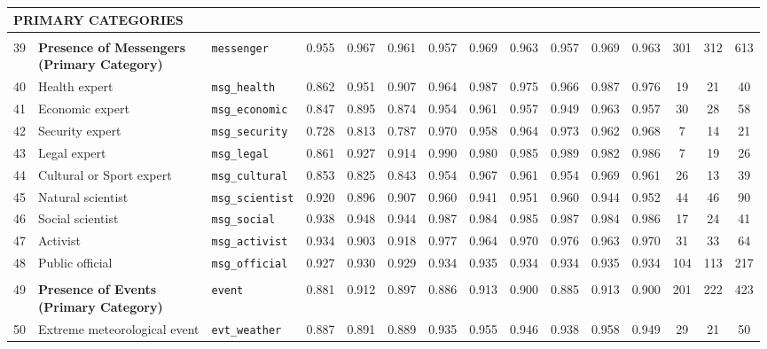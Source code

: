 \begin{longtable}{p{0.4cm}p{4.0cm}p{3.0cm}cccccccccccc}
\midrule
\multicolumn{15}{l}{\cellcolor{gray!10}\textbf{PRIMARY CATEGORIES}} \\
\midrule
\rowcolor{gray!8}
\multicolumn{15}{l}{\textit{Actors/Messengers}} \\
\midrule
39 & \textbf{Presence of Messengers\newline (Primary Category)} & \texttt{messenger} & 0.955 & 0.967 & 0.961 & 0.957 & 0.969 & 0.963 & 0.957 & 0.969 & 0.963 & 301 & 312 & 613 \\
\cmidrule(lr){1-15}
40 & Health expert & \texttt{msg\_health} & 0.862 & 0.951 & 0.907 & 0.964 & 0.987 & 0.975 & 0.966 & 0.987 & 0.976 & 19 & 21 & 40 \\
41 & Economic expert & \texttt{msg\_economic} & 0.847 & 0.895 & 0.874 & 0.954 & 0.961 & 0.957 & 0.949 & 0.963 & 0.957 & 30 & 28 & 58 \\
42 & Security expert & \texttt{msg\_security} & 0.728 & 0.813 & 0.787 & 0.970 & 0.958 & 0.964 & 0.973 & 0.962 & 0.968 & 7 & 14 & 21 \\
43 & Legal expert & \texttt{msg\_legal} & 0.861 & 0.927 & 0.914 & 0.990 & 0.980 & 0.985 & 0.989 & 0.982 & 0.986 & 7 & 19 & 26 \\
44 & Cultural or Sport expert & \texttt{msg\_cultural} & 0.853 & 0.825 & 0.843 & 0.954 & 0.967 & 0.961 & 0.954 & 0.969 & 0.961 & 26 & 13 & 39 \\
45 & Natural scientist & \texttt{msg\_scientist} & 0.920 & 0.896 & 0.907 & 0.960 & 0.941 & 0.951 & 0.960 & 0.944 & 0.952 & 44 & 46 & 90 \\
46 & Social scientist & \texttt{msg\_social} & 0.938 & 0.948 & 0.944 & 0.987 & 0.984 & 0.985 & 0.987 & 0.984 & 0.986 & 17 & 24 & 41 \\
47 & Activist & \texttt{msg\_activist} & 0.934 & 0.903 & 0.918 & 0.977 & 0.964 & 0.970 & 0.976 & 0.963 & 0.970 & 31 & 33 & 64 \\
48 & Public official & \texttt{msg\_official} & 0.927 & 0.930 & 0.929 & 0.934 & 0.935 & 0.934 & 0.934 & 0.935 & 0.934 & 104 & 113 & 217 \\
\midrule
\rowcolor{gray!8}
\multicolumn{15}{l}{\textit{Events}} \\
\midrule
49 & \textbf{Presence of Events\newline (Primary Category)} & \texttt{event} & 0.881 & 0.912 & 0.897 & 0.886 & 0.913 & 0.900 & 0.885 & 0.913 & 0.900 & 201 & 222 & 423 \\
\cmidrule(lr){1-15}
50 & Extreme meteorological event & \texttt{evt\_weather} & 0.887 & 0.891 & 0.889 & 0.935 & 0.955 & 0.946 & 0.938 & 0.958 & 0.949 & 29 & 21 & 50 \\

\end{longtable}
